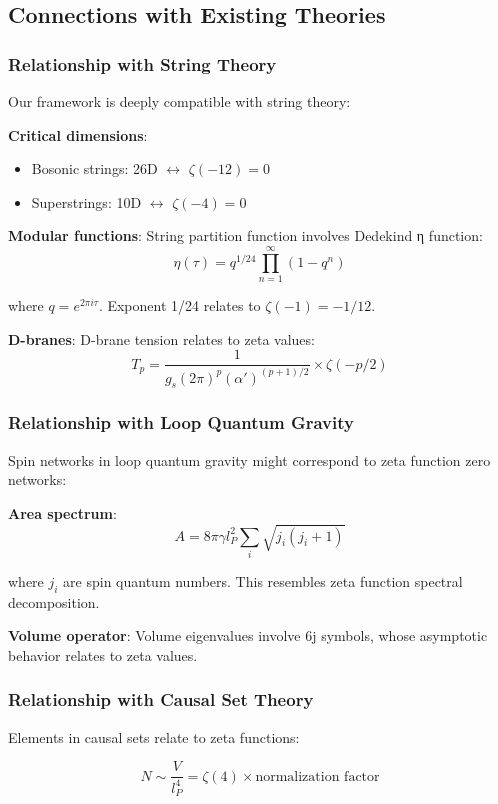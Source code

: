 \documentclass[12pt,a4paper]{article}
\begin{document}
\subsection{Connections with Existing Theories}

\subsubsection{Relationship with String Theory}

Our framework is deeply compatible with string theory:

\textbf{Critical dimensions}:
\begin{itemize}
\item Bosonic strings: 26D $\leftrightarrow$ $\zeta(-12) = 0$
\item Superstrings: 10D $\leftrightarrow$ $\zeta(-4) = 0$
\end{itemize}

\textbf{Modular functions}:
String partition function involves Dedekind η function:
$$\eta(\tau) = q^{1/24} \prod_{n=1}^{\infty} (1-q^n)$$

where $q = e^{2\pi i\tau}$. Exponent 1/24 relates to $\zeta(-1) = -1/12$.

\textbf{D-branes}:
D-brane tension relates to zeta values:
$$T_p = \frac{1}{g_s (2\pi)^p (\alpha')^{(p+1)/2}} \times \zeta(-p/2)$$

\subsubsection{Relationship with Loop Quantum Gravity}

Spin networks in loop quantum gravity might correspond to zeta function zero networks:

\textbf{Area spectrum}:
$$A = 8\pi\gamma l_P^2 \sum_i \sqrt{j_i(j_i+1)}$$

where $j_i$ are spin quantum numbers. This resembles zeta function spectral decomposition.

\textbf{Volume operator}:
Volume eigenvalues involve 6j symbols, whose asymptotic behavior relates to zeta values.

\subsubsection{Relationship with Causal Set Theory}

Elements in causal sets relate to zeta functions:

$$N \sim \frac{V}{l_P^4} = \zeta(4) \times \text{normalization factor}$$
\end{document}
